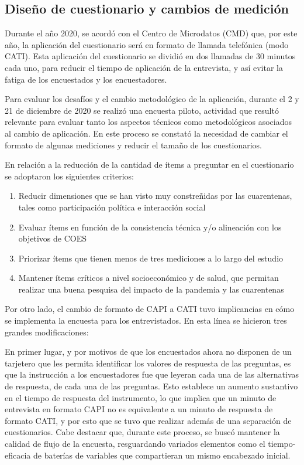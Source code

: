 \documentclass[
  12pt,
]{book}
\providecommand{\tightlist}{%
  \setlength{\itemsep}{0pt}\setlength{\parskip}{0pt}}
\begin{document}
\hypertarget{diseuxf1o-de-cuestionario-y-cambios-de-mediciuxf3n}{%
\subsection*{Diseño de cuestionario y cambios de medición}\label{diseuxf1o-de-cuestionario-y-cambios-de-mediciuxf3n}}

Durante el año 2020, se acordó con el Centro de Microdatos (CMD) que, por este año, la aplicación del cuestionario será en formato de llamada telefónica (modo CATI). Esta aplicación del cuestionario se dividió en dos llamadas de 30 minutos cada uno, para reducir el tiempo de aplicación de la entrevista, y así evitar la fatiga de los encuestados y los encuestadores.

Para evaluar los desafíos y el cambio metodológico de la aplicación, durante el 2 y 21 de diciembre de 2020 se realizó una encuesta piloto, actividad que resultó relevante para evaluar tanto los aspectos técnicos como metodológicos asociados al cambio de aplicación. En este proceso se constató la necesidad de cambiar el formato de algunas mediciones y reducir el tamaño de los cuestionarios.

En relación a la reducción de la cantidad de ítems a preguntar en el cuestionario se adoptaron los siguientes criterios:

\begin{enumerate}
\def\labelenumi{\arabic{enumi}.}
\tightlist
\item
  Reducir dimensiones que se han visto muy constreñidas por las cuarentenas, tales como participación política e interacción social
\item
  Evaluar ítems en función de la consistencia técnica y/o alineación con los objetivos de COES
\item
  Priorizar ítems que tienen menos de tres mediciones a lo largo del estudio
\item
  Mantener ítems críticos a nivel socioeconómico y de salud, que permitan realizar una buena pesquisa del impacto de la pandemia y las cuarentenas
\end{enumerate}

Por otro lado, el cambio de formato de CAPI a CATI tuvo implicancias en cómo se implementa la encuesta para los entrevistados. En esta línea se hicieron tres grandes modificaciones:

En primer lugar, y por motivos de que los encuestados ahora no disponen de un tarjetero que les permita identificar los valores de respuesta de las preguntas, es que la instrucción a los encuestadores fue que leyeran cada una de las alternativas de respuesta, de cada una de las preguntas. Esto establece un aumento sustantivo en el tiempo de respuesta del instrumento, lo que implica que un minuto de entrevista en formato CAPI no es equivalente a un minuto de respuesta de formato CATI, y por esto que se tuvo que realizar además de una separación de cuestionarios. Cabe destacar que, durante este proceso, se buscó mantener la calidad de flujo de la encuesta, resguardando variados elementos como el tiempo-eficacia de baterías de variables que compartieran un mismo encabezado inicial.
\end{document}
